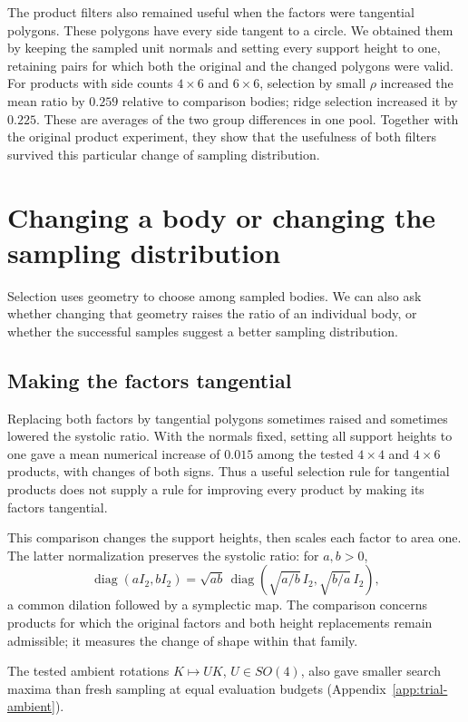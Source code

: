 The product filters also remained useful when the factors were tangential
polygons. These polygons have every side tangent to a circle. We obtained
them by keeping the sampled unit normals and setting every support height
to one, retaining pairs for which both the original and the changed
polygons were valid. For products with side counts $4\times6$ and
$6\times6$, selection by small $\rho$ increased the mean ratio by $0.259$
relative to comparison bodies; ridge selection increased it by $0.225$.
These are averages of the two group differences in one pool. Together
with the original product experiment, they show that the usefulness of
both filters survived this particular change of sampling distribution.

\section{Changing a body or changing the sampling distribution}

Selection uses geometry to choose among sampled bodies. We can also ask
whether changing that geometry raises the ratio of an individual body,
or whether the successful samples suggest a better sampling distribution.

\subsection{Making the factors tangential}

Replacing both factors by tangential polygons sometimes raised and
sometimes lowered the systolic ratio. With the normals fixed, setting
all support heights to one gave a mean numerical increase of $0.015$
among the tested $4\times4$ and $4\times6$ products, with changes of both
signs. Thus a useful selection rule for tangential products does not
supply a rule for improving every product by making its factors tangential.

This comparison changes the support heights, then scales each factor to
area one. The latter normalization preserves the systolic ratio: for
$a,b>0$,
\[
 \operatorname{diag}(aI_2,bI_2)
 =\sqrt{ab}\,\operatorname{diag}(\sqrt{a/b}\,I_2,\sqrt{b/a}\,I_2),
\]
a common dilation followed by a symplectic map. The comparison concerns
products for which the original factors and both height replacements
remain admissible; it measures the change of shape within that family.

The tested ambient rotations $K\mapsto UK$, $U\in SO(4)$, also gave
smaller search maxima than fresh sampling at equal evaluation budgets
(Appendix~\ref{app:trial-ambient}).

